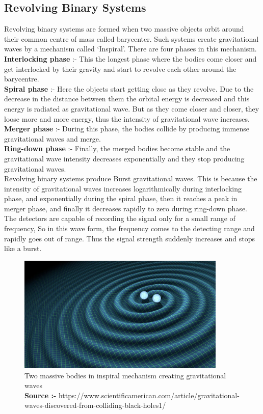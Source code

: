 \subsection{Revolving Binary Systems}

Revolving binary systems are formed when two massive objects orbit around their common centre of mass called barycenter. Such systems create gravitational waves by a mechanism called `Inspiral'. There are four phases in this mechanism. \\

\textbf{Interlocking phase} :- This the longest phase where the bodies come closer and get interlocked by their gravity and start to revolve each other around the barycentre. \\

\textbf{Spiral phase} :- Here the objects start getting close as they revolve. Due to the decrease in the distance between them the orbital energy is decreased and this energy is radiated as gravitational wave. But as they come closer and closer, they loose more and more energy, thus the intensity of gravitational wave increases.\\

\textbf{Merger phase} :- During this phase, the bodies collide by producing immense gravitational waves and merge. \\

\textbf{Ring-down phase} :- Finally, the merged bodies become stable and the gravitational wave intensity decreases exponentially and they stop producing gravitational waves. \\

Revolving binary systems produce Burst gravitational waves. This is because the intensity of gravitational waves increases logarithmically during interlocking phase, and exponentially during the spiral phase, then it reaches a peak in merger phase, and finally it decreases rapidly to zero during ring-down phase. The detectors are capable of recording the signal only for a small range of frequency, So in this wave form, the frequency comes to the detecting range and rapidly goes out of range. Thus the signal strength suddenly increases and stops like a burst.

\begin{figure}[h]
    \centering
    \includegraphics[height = 5.585cm, width = 12 cm]{images.tex/binaries.jpeg}
    \caption{Two massive bodies in inspiral mechanism creating gravitational waves \\
    \textbf{Source :-} https://www.scientificamerican.com/article/gravitational-waves-discovered-from-colliding-black-holes1/}
\end{figure}

